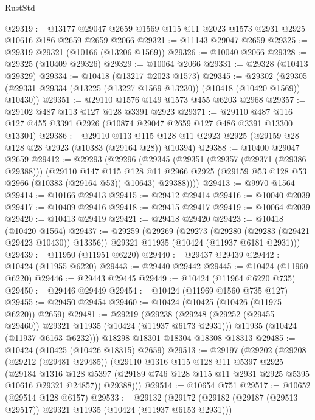 \begin{lexlean}{RustStd}
\begin{coremodule}
@29319 := @13177 @29047 @2659 @1569 @115 @11 @2023 @1573 @2931 @2925 @10616 @186 @2659 @2659 @2066
@29321 := @11143 @29047 @2659
@29325 := @29319 @29321 (@10166 (@13206 @1569))
@29326 := @10040 @2066
@29328 := @29325 (@10409 @29326)
@29329 := @10064 @2066
@29331 := @29328 (@10413 @29329)
@29334 := @10418 (@13217 @2023 @1573)
@29345 := @29302
    (@29305 (@29331 @29334 (@13225 (@13227 @1569 @13230)) (@10418 (@10420 @1569)) @10430))
@29351 := @29110 @1576 @149 @1573 @455 @6203 @2968
@29357 := @29102 @487 @113 @127 @128 @3391 @2923
@29371 := @29110 @487 @116 @127 @455 @3391 @2926 (@10874 @29047 @2659 @127 @486 @3391 @13300 @13304)
@29386 := @29110
    @113
    @115
    @128
    @11
    @2923
    @2925
    (@29159 @28 @128 @28 @2923 (@10383 (@29164 @28)) @10394)
@29388 := @10400 @29047 @2659
@29412 := @29293
    (@29296
      (@29345
        (@29351
          (@29357 (@29371 (@29386 @29388)))
          (@29110
            @147
            @115
            @128
            @11
            @2966
            @2925
            (@29159 @53 @128 @53 @2966 (@10383 (@29164 @53)) @10643)
            @29388))))
@29413 := @9970 @1564
@29414 := @10166 @29413
@29415 := @29412 @29414
@29416 := @10040 @2039
@29417 := @10409 @29416
@29418 := @29415 @29417
@29419 := @10064 @2039
@29420 := @10413 @29419
@29421 := @29418 @29420
@29423 := @10418 (@10420 @1564)
@29437 := @29259
    (@29269
      (@29273 (@29280 (@29283 (@29421 @29423 @10430)) @13356))
      @29321
      @11935
      (@10424 (@11937 @6181 @2931)))
@29439 := @11950 (@11951 @6220)
@29440 := @29437 @29439
@29442 := @10424 (@11955 @6220)
@29443 := @29440 @29442
@29445 := @10424 (@11960 @6220)
@29446 := @29443 @29445
@29449 := @10424 (@11964 @6220 @735)
@29450 := @29446 @29449
@29454 := @10424 (@11969 @1560 @735 @127)
@29455 := @29450 @29454
@29460 := @10424 (@10425 (@10426 (@11975 @6220)) @2659)
@29481 := @29219
    (@29238
      (@29248 (@29252 (@29455 @29460)) @29321 @11935 (@10424 (@11937 @6173 @2931)))
      @11935
      (@10424 (@11937 @6163 @6232)))
    @18298
    @18301
    @18304
    @18308
    @18313
@29485 := @10424 (@10425 (@10426 @18315) @2659)
@29513 := @29197
    (@29202
      (@29208
        (@29212 (@29481 @29485))
        (@29110
          @1316
          @115
          @128
          @11
          @5397
          @2925
          (@29184
            @1316
            @128
            @5397
            (@29189 @746 @128 @115 @11 @2931 @2925 @5395 @10616 @29321 @24857))
          @29388)))
@29514 := @10654 @751
@29517 := @10652 (@29514 @128 @6157)
@29533 := @29132
    (@29172
      (@29182 (@29187 (@29513 @29517)) @29321 @11935 (@10424 (@11937 @6153 @2931)))

\end{coremodule}
\end{lexlean}
